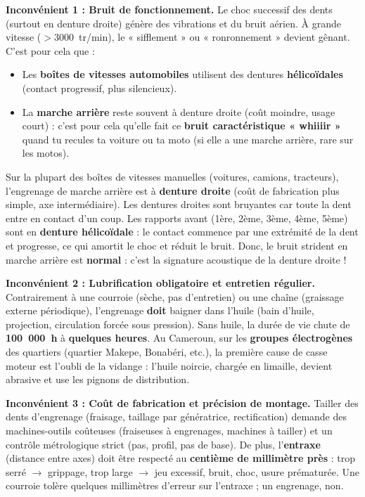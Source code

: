 \documentclass[11pt]{article}
\begin{document}
\textbf{Inconvénient 1 : Bruit de fonctionnement.} Le choc successif des dents (surtout en denture droite) génère des vibrations et du bruit aérien. À grande vitesse ($> 3000$~tr/min), le « sifflement » ou « ronronnement » devient gênant. C'est pour cela que :
\begin{itemize}
    \item Les \textbf{boîtes de vitesses automobiles} utilisent des dentures \textbf{hélicoïdales} (contact progressif, plus silencieux).
    \item La \textbf{marche arrière} reste souvent à denture droite (coût moindre, usage court) : c'est pour cela qu'elle fait ce \textbf{bruit caractéristique « whiiiir »} quand tu recules ta voiture ou ta moto (si elle a une marche arrière, rare sur les motos).
\end{itemize}

\begin{savaistu}
Sur la plupart des boîtes de vitesses manuelles (voitures, camions, tracteurs), l'engrenage de marche arrière est à \textbf{denture droite} (coût de fabrication plus simple, axe intermédiaire). Les dentures droites sont bruyantes car toute la dent entre en contact d'un coup. Les rapports avant (1ère, 2ème, 3ème, 4ème, 5ème) sont en \textbf{denture hélicoïdale} : le contact commence par une extrémité de la dent et progresse, ce qui amortit le choc et réduit le bruit. Donc, le bruit strident en marche arrière est \textbf{normal} : c'est la signature acoustique de la denture droite !
\end{savaistu}

\textbf{Inconvénient 2 : Lubrification obligatoire et entretien régulier.} Contrairement à une courroie (sèche, pas d'entretien) ou une chaîne (graissage externe périodique), l'engrenage \textbf{doit} baigner dans l'huile (bain d'huile, projection, circulation forcée sous pression). Sans huile, la durée de vie chute de \textbf{100~000~h} à \textbf{quelques heures}. Au Cameroun, sur les \textbf{groupes électrogènes} des quartiers (quartier Makepe, Bonabéri, etc.), la première cause de casse moteur est l'oubli de la vidange : l'huile noircie, chargée en limaille, devient abrasive et use les pignons de distribution.

\textbf{Inconvénient 3 : Coût de fabrication et précision de montage.} Tailler des dents d'engrenage (fraisage, taillage par génératrice, rectification) demande des machines-outils coûteuses (fraiseuses à engrenages, machines à tailler) et un contrôle métrologique strict (pas, profil, pas de base). De plus, l'\textbf{entraxe} (distance entre axes) doit être respecté au \textbf{centième de millimètre près} : trop serré $\rightarrow$ grippage, trop large $\rightarrow$ jeu excessif, bruit, choc, usure prématurée. Une courroie tolère quelques millimètres d'erreur sur l'entraxe ; un engrenage, non.
\end{document}

